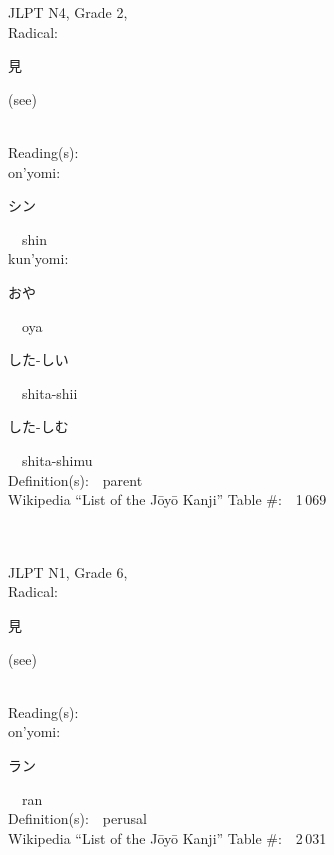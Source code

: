 \begin{multicols}{2}
{JLPT N4, Grade 2, \\Radical:\ \ {\begin{CJK}{UTF8}{min} 見 \end{CJK}} (see) } \\
Reading(s):\ \ \\
{\hspace*{1em}}on'yomi:\ \ \\
{\hspace*{2em}}{\begin{CJK}{UTF8}{min} シン \end{CJK}}\ \ shin\ \ \\
{\hspace*{1em}}kun'yomi:\ \ \\
{\hspace*{2em}}{\begin{CJK}{UTF8}{min} おや \end{CJK}}\ \ oya\ \ \\
{\hspace*{2em}}{\begin{CJK}{UTF8}{min} した-しい \end{CJK}}\ \ shita-shii\ \ \\
{\hspace*{2em}}{\begin{CJK}{UTF8}{min} した-しむ \end{CJK}}\ \ shita-shimu\ \ \\
Definition(s):\ \ parent \\
Wikipedia ``List of the J\=oy\=o Kanji'' Table \#:\ \ 1\,069 \\
\ \ \\
{\fontsize{34pt}{40pt}  }\ \ \\  %
{JLPT N1, Grade 6, \\Radical:\ \ {\begin{CJK}{UTF8}{min} 見 \end{CJK}} (see) } \\
Reading(s):\ \ \\
{\hspace*{1em}}on'yomi:\ \ \\
{\hspace*{2em}}{\begin{CJK}{UTF8}{min} ラン \end{CJK}}\ \ ran\ \ \\
Definition(s):\ \ perusal \\
Wikipedia ``List of the J\=oy\=o Kanji'' Table \#:\ \ 2\,031 \\
\ \ \\
\end{multicols}


